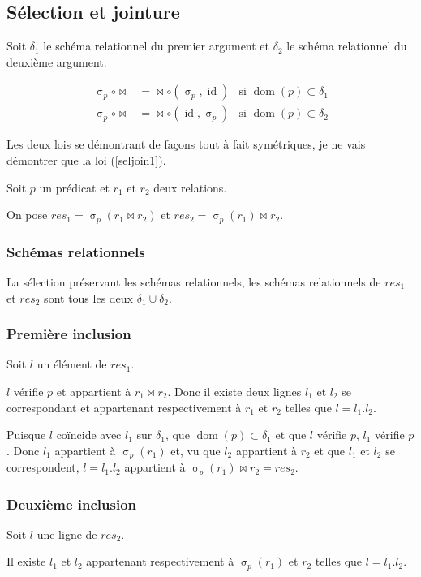 \documentclass[french]{article}
\DeclareMathOperator{\sel}{\sigma}
\DeclareMathOperator{\id}{id}
\DeclareMathOperator{\dom}{dom}
\newcommand{\selP}{\sel_p}
\newcommand{\args}{Soit $\delta_1$ le schéma relationnel du premier
	argument et $\delta_2$ le schéma relationnel du deuxième
	argument.}
\begin{document}
\subsection*{Sélection et jointure}
\args

\begin{align}
\selP \circ \Join
& = \Join \circ (\selP, \id)
& \text{si $\dom(p) \subset \delta_1$}
\label{seljoin1}\\ 
\selP \circ \Join
& = \Join \circ (\id, \selP)
& \text{si $\dom(p) \subset \delta_2$}
\end{align}

Les deux lois se démontrant de façons tout à fait 
symétriques, je ne vais démontrer que la loi (\ref{seljoin1}).

Soit $p$ un prédicat et $r_1$ et $r_2$ deux relations.

On pose $res_1 = \selP(r_1 \Join r_2)$ et
$res_2 = \selP(r_1) \Join r_2$.

\subsubsection*{Schémas relationnels}
La sélection préservant les schémas relationnels,
les schémas relationnels de $res_1$ et $res_2$
sont tous les deux $\delta_1 \cup \delta_2$.

\subsubsection*{Première inclusion}
Soit $l$ un élément de $res_1$.

$l$ vérifie $p$ et appartient à $r_1 \Join r_2$.
Donc il existe deux lignes $l_1$ et $l_2$
se correspondant et appartenant respectivement
à $r_1$ et $r_2$ telles que $l= l_1 . l_2$.

Puisque $l$ coïncide avec $l_1$ sur $\delta_1$,
que $\dom(p) \subset \delta_1$ et que $l$ vérifie $p$,
$l_1$ vérifie $p$. Donc $l_1$ appartient à $\selP(r_1)$
et, vu que $l_2$ appartient à $r_2$ et que $l_1$ et $l_2$
se correspondent, $l = l_1. l_2$ appartient à $\selP(r_1) \Join r_2 = res_2$.

\subsubsection*{Deuxième inclusion}
Soit $l$ une ligne de $res_2$.

Il existe $l_1$ et $l_2$ appartenant respectivement à
$\selP(r_1)$ et $r_2$ telles que
$l = l_1 . l_2 $.
\end{document}
